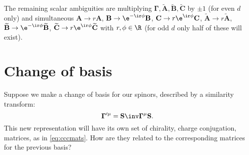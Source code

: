 \documentclass[11pt]{article}
\newcommand{\Gammab}{\boldsymbol{\Gamma}}
\renewcommand{\S}{\mathbf{S}}
\newcommand{\A}{\mathbf{A}}
\newcommand{\B}{\mathbf{B}}
\renewcommand{\C}{\mathbf{C}}
\newcommand{\At}{\widetilde{\A}}
\newcommand{\Bt}{\widetilde{\B}}
\newcommand{\Ct}{\widetilde{\C}}
\begin{document}
The remaining scalar ambiguities are multiplying $\Gammab,\At,\Bt,\Ct$ by $\pm1$ (for even $d$ only)
and simultaneous \( \A \rightarrow r \A \),
\( \B \rightarrow \e^{-\ir\phi} \B \), \( \C \rightarrow r\e^{\ir\phi} \C \),
\( \At \rightarrow r \At \), \( \Bt \rightarrow \e^{-\ir\phi} \Bt \),
\( \Ct \rightarrow r\e^{\ir\phi} \Ct \) with \( r, \phi \in \R \) (for odd $d$ only half of these will exist).



\section{Change of basis}\label{sec:basis}

Suppose we make a change of basis for our spinors, described by a similarity transform:
%
\begin{equation*}
  \Gammab'^{\mu} = \S\inv \Gammab^\mu \S.
\end{equation*}
%
This new representation will have its own set of chirality, charge conjugation, \etc matrices, as in \cref{eq:cccmats}.
How are they related to the corresponding matrices for the previous basis?
\end{document}
